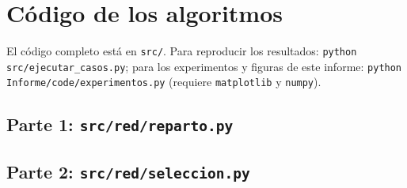 \section{Código de los algoritmos}

El código completo está en \texttt{src/}. Para reproducir los resultados:
\texttt{python src/ejecutar\_casos.py}; para los experimentos y figuras de este informe:
\texttt{python Informe/code/experimentos.py} (requiere \texttt{matplotlib} y \texttt{numpy}).

\subsection{Parte 1: \texttt{src/red/reparto.py}}


\subsection{Parte 2: \texttt{src/red/seleccion.py}}


